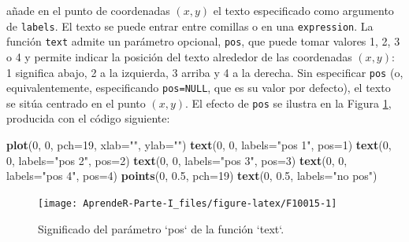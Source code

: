 \documentclass[]{book}
\newenvironment{Shaded}{\begin{snugshade}}{\end{snugshade}}
\newcommand{\DataTypeTok}[1]{\textcolor[rgb]{0.13,0.29,0.53}{#1}}
\newcommand{\DecValTok}[1]{\textcolor[rgb]{0.00,0.00,0.81}{#1}}
\newcommand{\FloatTok}[1]{\textcolor[rgb]{0.00,0.00,0.81}{#1}}
\newcommand{\KeywordTok}[1]{\textcolor[rgb]{0.13,0.29,0.53}{\textbf{#1}}}
\newcommand{\NormalTok}[1]{#1}
\newcommand{\StringTok}[1]{\textcolor[rgb]{0.31,0.60,0.02}{#1}}
\theoremstyle{definition}
\theoremstyle{definition}
\theoremstyle{definition}
\theoremstyle{remark}
\begin{document}
añade en el punto de coordenadas \((x, y)\) el texto especificado como argumento de \texttt{labels}. El texto se puede entrar entre comillas o en una \texttt{expression}. La función \texttt{text} admite un parámetro opcional, \texttt{pos}, que puede tomar valores 1, 2, 3 o 4 y permite indicar la posición del texto alrededor de las coordenadas \((x, y)\): 1 significa abajo, 2 a la izquierda, 3 arriba y 4 a la derecha. Sin especificar \texttt{pos} (o, equivalentemente, especificando \texttt{pos=NULL}, que es su valor por defecto), el texto se sitúa centrado en el punto \((x, y)\). El efecto de \texttt{pos} se ilustra en la Figura \ref{fig:F10015}, producida con el código siguiente:

\begin{Shaded}
\begin{Highlighting}[]
\KeywordTok{plot}\NormalTok{(}\DecValTok{0}\NormalTok{, }\DecValTok{0}\NormalTok{, }\DataTypeTok{pch=}\DecValTok{19}\NormalTok{, }\DataTypeTok{xlab=}\StringTok{""}\NormalTok{, }\DataTypeTok{ylab=}\StringTok{""}\NormalTok{)}
\KeywordTok{text}\NormalTok{(}\DecValTok{0}\NormalTok{, }\DecValTok{0}\NormalTok{, }\DataTypeTok{labels=}\StringTok{"pos 1"}\NormalTok{, }\DataTypeTok{pos=}\DecValTok{1}\NormalTok{)}
\KeywordTok{text}\NormalTok{(}\DecValTok{0}\NormalTok{, }\DecValTok{0}\NormalTok{, }\DataTypeTok{labels=}\StringTok{"pos 2"}\NormalTok{, }\DataTypeTok{pos=}\DecValTok{2}\NormalTok{)}
\KeywordTok{text}\NormalTok{(}\DecValTok{0}\NormalTok{, }\DecValTok{0}\NormalTok{, }\DataTypeTok{labels=}\StringTok{"pos 3"}\NormalTok{, }\DataTypeTok{pos=}\DecValTok{3}\NormalTok{)}
\KeywordTok{text}\NormalTok{(}\DecValTok{0}\NormalTok{, }\DecValTok{0}\NormalTok{, }\DataTypeTok{labels=}\StringTok{"pos 4"}\NormalTok{, }\DataTypeTok{pos=}\DecValTok{4}\NormalTok{)}
\KeywordTok{points}\NormalTok{(}\DecValTok{0}\NormalTok{, }\FloatTok{0.5}\NormalTok{, }\DataTypeTok{pch=}\DecValTok{19}\NormalTok{)}
\KeywordTok{text}\NormalTok{(}\DecValTok{0}\NormalTok{, }\FloatTok{0.5}\NormalTok{, }\DataTypeTok{labels=}\StringTok{"no pos"}\NormalTok{)}
\end{Highlighting}
\end{Shaded}

\begin{figure}

{\centering \texttt{[image: AprendeR-Parte-I\_files/figure-latex/F10015-1]} 

}

\caption{Significado del parámetro `pos` de la función `text`.}\label{fig:F10015}
\end{figure}
\end{document}
